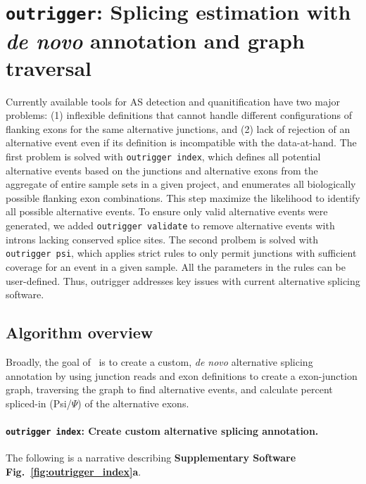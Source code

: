 \section{\texttt{outrigger}: Splicing estimation with \emph{de novo} annotation and graph traversal}
\label{sec:outrigger}

Currently available tools for AS detection and quanitification have two major problems: (1) inflexible definitions that cannot handle different configurations of flanking exons for the same alternative junctions, and (2) lack of rejection of an alternative event even if its definition is incompatible with the data-at-hand. The first problem is solved with \texttt{outrigger index}, which defines all potential alternative events based on the junctions and alternative exons from the aggregate of entire sample sets in a given project, and enumerates all biologically possible flanking exon combinations. This step maximize the likelihood to identify all possible alternative events. To ensure only valid alternative events were generated, we added \texttt{outrigger validate} to remove alternative events with introns lacking conserved splice sites. The second prolbem is solved with \texttt{outrigger psi}, which applies strict rules to only permit junctions with sufficient coverage for an event in a given sample. All the parameters in the rules can be user-defined. Thus, outrigger addresses key issues with current alternative splicing software.

\subsection{Algorithm overview}

Broadly, the goal of \outrigger\, is to create a custom, \emph{de novo} alternative splicing annotation by using junction reads and exon definitions to create a exon-junction graph, traversing the graph to find alternative events, and calculate percent spliced-in (Psi/$\Psi$) of the alternative exons.

\paragraph{\texttt{outrigger index}: Create custom alternative splicing annotation.} The following is a narrative describing \textbf{Supplementary Software Fig.~\ref{fig:outrigger_index}a}.

